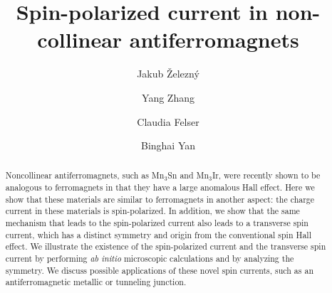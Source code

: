 \documentclass[aps,prl,reprint,amsmath,amssymb,superscriptaddress]{revtex4-1}
\begin{document}
\title{Spin-polarized current in non-collinear antiferromagnets} 

\author{Jakub \v{Z}elezn{\'y}}

\author{Yang Zhang}

\author{Claudia Felser}

\author{Binghai Yan}


\begin{abstract}
Noncollinear antiferromagnets, such as Mn$_3$Sn and Mn$_3$Ir, were recently shown to be analogous to ferromagnets in that they have a large anomalous Hall effect. Here we show that these materials are similar to ferromagnets in another aspect: the charge current in these materials is spin-polarized. In addition, we show that the same mechanism that leads to the spin-polarized current also leads to a transverse spin current, which has a distinct symmetry and origin from the conventional spin Hall effect. We illustrate the existence of the spin-polarized current and the transverse spin current by performing \emph{ab initio} microscopic calculations and by analyzing the symmetry. We discuss possible applications of these novel spin currents, such as an antiferromagnetic metallic or tunneling junction.
\end{abstract}

\maketitle
\end{document}
